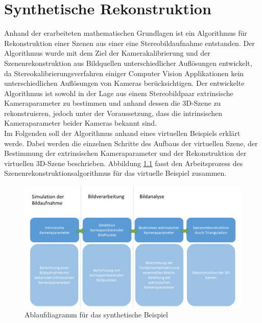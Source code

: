 \chapter{Synthetische Rekonstruktion}
\label{sec:minimal} 

Anhand der erarbeiteten mathematischen Grundlagen ist ein Algorithmus für Rekonstruktion einer Szenen aus einer eine Stereobildaufnahme entstanden. Der Algorithmus wurde mit dem Ziel der Kamerakalibrierung und der Szenenrekonstruktion aus Bildquellen unterschiedlicher Auflösungen entwickelt, da Stereokalibrierungsverfahren einiger Computer Vision Applikationen kein unterschiedlichen Auflösungen von Kameras berücksichtigen.
Der entwickelte Algorithmus ist sowohl in der Lage aus einem Stereobildpaar extrinsische Kameraparameter zu bestimmen und anhand dessen die 3D-Szene zu rekonstruieren, jedoch unter der Voraussetzung, dass die intrinsischen Kameraparameter beider Kameras bekannt sind.\\

Im Folgenden soll der Algorithmus anhand eines virtuellen Beispiels erklärt werde. Dabei werden die einzelnen Schritte des Aufbaus der virtuellen Szene, der Bestimmung der extrinsischen Kameraparameter und der Rekonstruktion der virtuellen 3D-Szene beschrieben. Abbildung \ref{fig:ArbeitsProzessVirtuell} fasst den Arbeitsprozess des Szenenrekonstruktionsalgorithmus für das virtuelle Beispiel zusammen. \\



\begin{figure}[!htb]%
	\centering
	\includegraphics[width=1.\linewidth]{images/NEU_Virtuel_Arbeitsprozess.png}
	\caption[Ablaufdiagram]{Ablaufdiagramm für das synthetische Beispiel}
	\label{fig:ArbeitsProzessVirtuell}
\end{figure}

